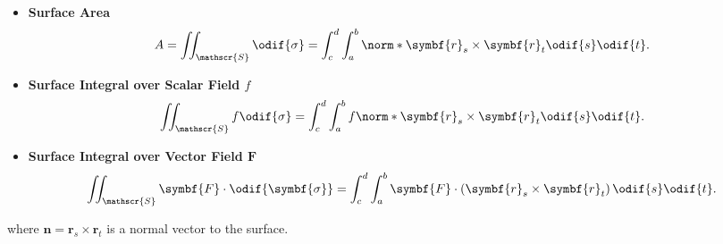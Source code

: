 \documentclass{article}
\begin{document}
\begin{itemize}
    \item \textbf{Surface Area}
          \begin{equation*}
              A = \iint_{\mathscr{S}} \odif{\sigma} = \int_c^d \int_a^b \norm*{\symbf{r}_s \times \symbf{r}_t} \odif{s} \odif{t}.
          \end{equation*}
    \item \textbf{Surface Integral over Scalar Field \(f\)}
            \begin{equation*}
                \iint_{\mathscr{S}} f \odif{\sigma} = \int_c^d \int_a^b f \norm*{\symbf{r}_s \times \symbf{r}_t} \odif{s} \odif{t}.
            \end{equation*}
    \item \textbf{Surface Integral over Vector Field \(\symbf{F}\)}
            \begin{equation*}
                \iint_{\mathscr{S}} \symbf{F} \cdot \odif{\symbf{\sigma}} = \int_c^d \int_a^b \symbf{F} \cdot \left( \symbf{r}_s \times \symbf{r}_t \right) \odif{s} \odif{t}.
            \end{equation*}
\end{itemize}
where \(\symbf{n} = \symbf{r}_s \times \symbf{r}_t\) is a normal
vector to the surface.
\end{document}
